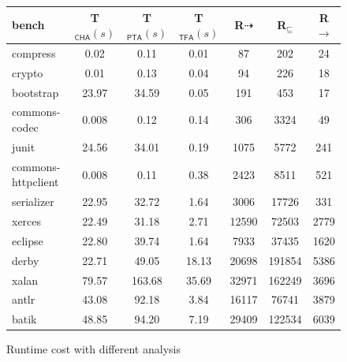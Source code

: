 \documentclass{llncs}
\newcommand{\less}{\sqsubseteq}
\newcommand{\tflow}{\dashrightarrow}
\begin{document}
\begin{figure}[t!]\centering
\begin{tabular}{lcccccc}
	\hline
	\textbf{bench} & \textbf{T$_{\textsf{CHA}}(s)$} & \textbf{T$_{\textsf{PTA}}(s)$} & \textbf{T$_{\textsf{TFA}}(s)$} & \hspace{2pt}\textbf{R${\tflow}$}\hspace{2pt} & \hspace{2pt}\textbf{R$_{\less}$}\hspace{2pt} & \hspace{2pt}\textbf{R${\rightarrow}$} \hspace{2pt}\\
	\hline
	compress & 0.02 & 0.11 & 0.01 & 87 & 202 & 24\\
	crypto & 0.01 & 0.13 & 0.04 & 94 & 226 & 18\\
	bootstrap & 23.97 & 34.59 & 0.05 & 191 & 453 & 17\\
	commons-codec & 0.008 & 0.12 & 0.14 & 306 & 3324 & 49\\
	junit & 24.56 & 34.01 & 0.19 & 1075 & 5772 & 241\\
	commons-httpclient & 0.008 & 0.11 & 0.38 & 2423 & 8511 & 521 \\
	serializer & 22.95 & 32.72 & 1.64 & 3006 & 17726 & 331\\
	xerces & 22.49 & 31.18 & 2.71 & 12590 & 72503 & 2779\\
	eclipse & 22.80 & 39.74 & 1.64 & 7933 & 37435 & 1620\\
	derby & 22.71 & 49.05 & 18.13 & 20698 & 191854 & 5386\\
	xalan & 79.57 & 163.68 & 35.69 & 32971 & 162249 & 3696\\
	antlr & 43.08 & 92.18 & 3.84 & 16117 & 76741 & 3879\\
	batik & 48.85 & 94.20 & 7.19 & 29409 & 122534 & 6039 \\
	\hline
\end{tabular}
\caption{Runtime cost with different analysis}
\label{experiment:TimeCost}
\end{figure}
\end{document}
